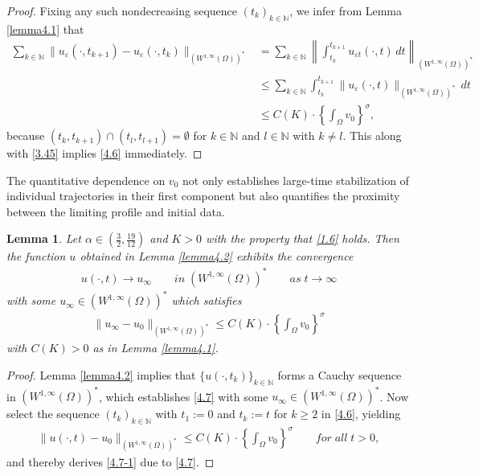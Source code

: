 \documentclass[12pt]{article}
\theoremstyle{plain}
\newtheorem{lemma}{Lemma}[section]
\theoremstyle{definition}
\numberwithin{equation}{section}
\begin{document}
\begin{proof}
     Fixing any such nondecreasing sequence $(t_k)_{k \in \mathbb{N}}$, we infer from Lemma \ref{lemma4.1} that
     \begin{align*}
         \sum_{k\in \mathbb{N}} \| u_{\varepsilon}(\cdot, t_{k+1}) - u_{\varepsilon}(\cdot, t_k) \|_{(W^{1,\infty}(\Omega))^*}
    &= \sum_{k\in \mathbb{N}} \left\| \int_{t_k}^{t_{k+1}} u_{\varepsilon t}(\cdot, t) \, dt \right\|_{(W^{1,\infty}(\Omega))^*}\\
    &\leq \sum_{k\in \mathbb{N}} \int_{t_k}^{t_{k+1}} \| u_{\varepsilon}(\cdot, t) \|_{(W^{1,\infty}(\Omega))^*} \, dt\\
    &\leq C(K) \cdot \left\{ \int_{\Omega} v_{0} \right\}^{\sigma},
     \end{align*}
     because $(t_k, t_{k+1}) \cap (t_l, t_{l+1}) = \emptyset$ for $k \in \mathbb{N}$ and $l \in \mathbb{N}$ with $k \neq l$. This along with \eqref{3.45} implies \eqref{4.6} immediately.
\end{proof}
The quantitative dependence on $v_0$ not only establishes large-time stabilization of individual trajectories in their first component but also quantifies the proximity between the limiting profile and initial data.
\begin{lemma}\label{lemma4.3}
Let $\alpha\in\left(\frac{3}{2},\frac{19}{12}\right)$ and $K>0$ with the property that \eqref{1.6} holds.  Then  the function $u$ obtained in Lemma \ref{lemma4.2} exhibits the convergence
\begin{align}\label{4.7}
    u(\cdot,t)\rightarrow u_{\infty}\qquad in\;(W^{1,\infty}(\Omega))^*\qquad as\; t\to \infty
\end{align}
with some $u_{\infty}\in(W^{1,\infty}(\Omega))^*$ which satisfies
\begin{align}\label{4.7-1}
    \|u_{\infty}-u_0\|_{(W^{1,\infty}(\Omega))^*}\leq C(K)\cdot \left\{\int_{\Omega} v_{0}\right\}^{\sigma}
\end{align}
with $C(K)>0$  as in Lemma \ref{lemma4.1}.
\end{lemma}
\begin{proof}
    Lemma \ref{lemma4.2} implies that $\{u(\cdot,t_{k})\}_{k\in \mathbb{N}}$ forms a Cauchy sequence in $(W^{1,\infty}(\Omega))^*$, which establishes \eqref{4.7} with some $u_{\infty}\in(W^{1,\infty}(\Omega))^*$. Now select the sequence $(t_{k})_{k\in \mathbb{N}}$ with $t_1:=0$ and $t_k:=t$ for $k\geq 2$ in \eqref{4.6}, yielding
    \begin{align}\label{4.7-2}
        \|u(\cdot,t)-u_0\|_{(W^{1,\infty}(\Omega))^*}\leq C(K)\cdot \left\{\int_{\Omega} v_{0}\right\}^{\sigma}\qquad for \;all\; t>0,
\end{align}
and thereby derives \eqref{4.7-1} due to \eqref{4.7}.
\end{proof}
\end{document}
